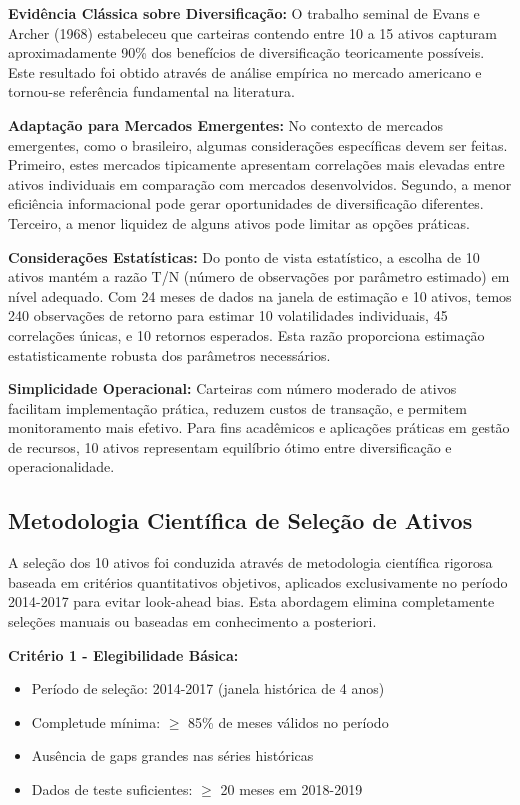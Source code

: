 \textbf{Evidência Clássica sobre Diversificação:} O trabalho seminal de Evans e Archer (1968) estabeleceu que carteiras contendo entre 10 a 15 ativos capturam aproximadamente 90\% dos benefícios de diversificação teoricamente possíveis. Este resultado foi obtido através de análise empírica no mercado americano e tornou-se referência fundamental na literatura.

\textbf{Adaptação para Mercados Emergentes:} No contexto de mercados emergentes, como o brasileiro, algumas considerações específicas devem ser feitas. Primeiro, estes mercados tipicamente apresentam correlações mais elevadas entre ativos individuais em comparação com mercados desenvolvidos. Segundo, a menor eficiência informacional pode gerar oportunidades de diversificação diferentes. Terceiro, a menor liquidez de alguns ativos pode limitar as opções práticas.

\textbf{Considerações Estatísticas:} Do ponto de vista estatístico, a escolha de 10 ativos mantém a razão T/N (número de observações por parâmetro estimado) em nível adequado. Com 24 meses de dados na janela de estimação e 10 ativos, temos 240 observações de retorno para estimar 10 volatilidades individuais, 45 correlações únicas, e 10 retornos esperados. Esta razão proporciona estimação estatisticamente robusta dos parâmetros necessários.

\textbf{Simplicidade Operacional:} Carteiras com número moderado de ativos facilitam implementação prática, reduzem custos de transação, e permitem monitoramento mais efetivo. Para fins acadêmicos e aplicações práticas em gestão de recursos, 10 ativos representam equilíbrio ótimo entre diversificação e operacionalidade.

\subsection{Metodologia Científica de Seleção de Ativos}

A seleção dos 10 ativos foi conduzida através de metodologia científica rigorosa baseada em critérios quantitativos objetivos, aplicados exclusivamente no período 2014-2017 para evitar look-ahead bias. Esta abordagem elimina completamente seleções manuais ou baseadas em conhecimento a posteriori.

\textbf{Critério 1 - Elegibilidade Básica:}
\begin{itemize}
    \item Período de seleção: 2014-2017 (janela histórica de 4 anos)
    \item Completude mínima: $\geq$ 85\% de meses válidos no período
    \item Ausência de gaps grandes nas séries históricas
    \item Dados de teste suficientes: $\geq$ 20 meses em 2018-2019
\end{itemize}

